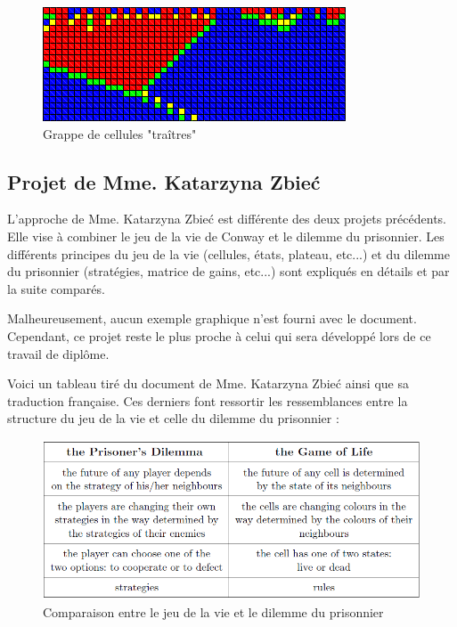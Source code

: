 \documentclass[a4paper, french]{article}
\begin{document}
\begin{figure}[htp]
    \centering
    \includegraphics[width=9cm]{defect_cluster.png}
    \caption{Grappe de cellules "traîtres"}
\end{figure}


\pagebreak
\subsection{Projet de Mme. Katarzyna Zbieć}
L'approche de Mme. Katarzyna Zbieć est différente des deux projets précédents. Elle vise à combiner le jeu de la vie de Conway et le dilemme du prisonnier. Les différents principes du jeu de la vie (cellules, états, plateau, etc...) et du dilemme du prisonnier (stratégies, matrice de gains, etc...) sont expliqués en détails et par la suite comparés.

Malheureusement, aucun exemple graphique n'est fourni avec le document. Cependant, ce projet reste le plus proche à celui qui sera développé lors de ce travail de diplôme.

Voici un tableau tiré du document de Mme. Katarzyna Zbieć ainsi que sa traduction française. Ces derniers font ressortir les ressemblances entre la structure du jeu de la vie et celle du dilemme du prisonnier :

\begin{figure}[htp]
    \centering
    \includegraphics[width=\linewidth - 3cm]{dilemma_gol.png}
    \caption{Comparaison entre le jeu de la vie et le dilemme du prisonnier}
\end{figure}
\end{document}
